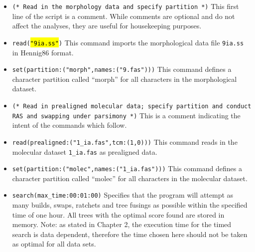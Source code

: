 \begin{itemize}
\item \texttt{(* Read in the morphology data and specify partition *)} This first line of the script is a comment. While 
comments are optional and do not affect the analyses, they are useful for housekeeping purposes.
\item \texttt{read(\hl{"9ia.ss"})} %
This command imports the morphological data file \texttt{9ia.ss} in Hennig86 format. 
\item \texttt{set(partition:("morph",names:("9.fas")))}
This command defines a character partition called ``morph'' for all characters in the morphological dataset.

\item \texttt{(* Read in prealigned molecular data; specify partition and conduct RAS and swapping under parsimony *)}
This is a comment indicating the intent of the commands which follow.
\item \texttt{read(prealigned:("1\_ia.fas",tcm:(1,0)))} %
This command reads in the molecular dataset \texttt{1\_ia.fas} as prealigned data.
\item \texttt{set(partition:("molec",names:("1\_ia.fas")))}
This command defines a character partition called ``molec'' for all characters in the molecular dataset.
\item \texttt{search(max\_time:00:01:00)} Specifies that the program will attempt as many builds, swaps, ratchets 
and tree fusings as possible within the specified time of one hour. All trees with the optimal score found are stored 
in memory. Note: as stated in Chapter 2, the execution time for the timed search is data dependent, 
therefore the time chosen here should not be taken as optimal for all data sets.


\end{itemize}
